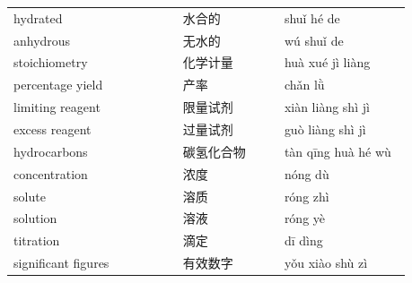 \documentclass[11pt]{article}
\begin{document}
\begin{longtable}{@{}p{0.40\linewidth}p{0.24\linewidth}p{0.30\linewidth}@{}}
hydrated & 水合的 & shuǐ hé de \\
anhydrous & 无水的 & wú shuǐ de \\
stoichiometry & 化学计量 & huà xué jì liàng \\
percentage yield & 产率 & chǎn lǜ \\
limiting reagent & 限量试剂 & xiàn liàng shì jì \\
excess reagent & 过量试剂 & guò liàng shì jì \\
hydrocarbons & 碳氢化合物 & tàn qīng huà hé wù \\
concentration & 浓度 & nóng dù \\
solute & 溶质 & róng zhì \\
solution & 溶液 & róng yè \\
titration & 滴定 & dī dìng \\
significant figures & 有效数字 & yǒu xiào shù zì \\
\end{longtable}
\end{document}
